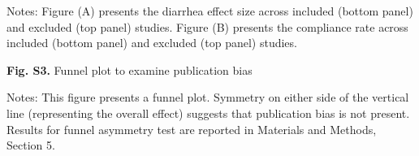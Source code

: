 \documentclass[12pt]{article}
\begin{document}
\vspace{\baselineskip}

\noindent\fontsize{10}{10}\selectfont Notes:  Figure (A) presents the diarrhea effect size across included (bottom panel) and excluded (top panel) studies. Figure (B) presents the compliance rate across included (bottom panel) and excluded (top panel) studies.



\newpage
\noindent\textbf{Fig. S3.} Funnel plot to examine publication bias

\begin{figure}[H]
    \centering
\end{figure}

\noindent\fontsize{10}{10}\selectfont Notes: This figure presents a funnel plot. Symmetry on either side of the vertical line (representing the overall effect) suggests that publication bias is not present. Results for funnel asymmetry test are reported in Materials and Methods, Section 5.
\end{document}
